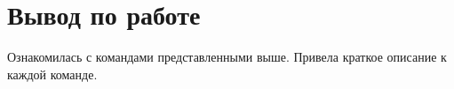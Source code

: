 \documentclass[a4paper,14pt]{extarticle}
\begin{document}
%
%    


\section{Вывод по работе}
Ознакомилась с командами представленными выше. Привела краткое описание к каждой команде.


% 
% 
% 
% 
% 
% 
%
%
%  
%  
%  
\end{document}
